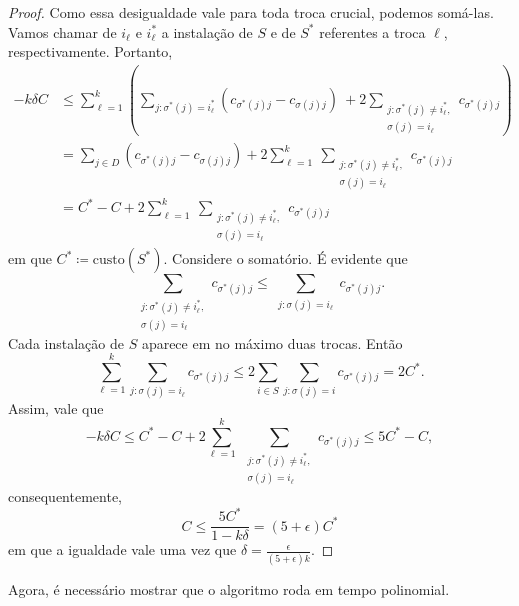 \begin{proof}
Como essa desigualdade vale para toda troca crucial, podemos somá-las. Vamos chamar de $i_\ell$ e $i_\ell^*$ a instalação de $S$ e de $S^*$ referentes a troca $\ell$, respectivamente. Portanto,
\begin{subequations}
\begin{align*}
- k \delta C &\leq \sum_{\ell = 1}^k \left(  \sum_{j : \sigma^*(j) = i_\ell^*} (c_{\sigma^*(j)j} - c_{\sigma(j)j}) \ + 2 \sum_{\substack{ j : \sigma^*(j)\neq i_\ell^*,\\  \sigma(j) = i_\ell}} c_{\sigma^*(j)j}     \right) \\
&= \sum_{j\in D} (c_{\sigma^*(j)j} - c_{\sigma(j)j}) + 2 \sum_{\ell = 1}^k \ \sum_{\substack{ j : \sigma^*(j)\neq i_\ell^*,\\  \sigma(j) = i_\ell}} c_{\sigma^*(j)j} \\
&= C^* - C + 2 \sum_{\ell = 1}^k \ \sum_{\substack{ j : \sigma^*(j)\neq i_\ell^*,\\  \sigma(j) = i_\ell}} c_{\sigma^*(j)j}
\end{align*}
\end{subequations}
em que $C^* \coloneqq \text{custo}(S^*)$. Considere o somatório. É evidente que 
\[\sum_{\substack{ j : \sigma^*(j)\neq i_\ell^*,\\  \sigma(j) = i_\ell}} c_{\sigma^*(j)j} \leq \sum_{\substack{j:\sigma(j) = i_\ell}} c_{\sigma^*(j)j}.\]
Cada instalação de $S$ aparece em no máximo duas trocas. Então
\[ \sum_{\ell=1}^k \sum_{j: \sigma(j) = i_\ell} c_{\sigma^*(j)j} \leq 2\sum_{i \in S} \sum_{j: \sigma(j) = i} c_{\sigma^*(j)j} = 2 C^*.\]
Assim, vale que 
\[ - k \delta C \leq C^* - C + 2 \sum_{\ell = 1}^k \ \sum_{\substack{ j : \sigma^*(j)\neq i_\ell^*,\\  \sigma(j) = i_\ell}} c_{\sigma^*(j)j} \leq 5C^* - C,\]
consequentemente, 
\[C \leq \frac{5C^*}{1 - k\delta} = (5+\epsilon)C^*\]
em que a igualdade vale uma vez que $\delta = \frac{\epsilon}{(5+\epsilon)k}$.
\end{proof}
Agora, é necessário mostrar que o algoritmo roda em tempo polinomial.

